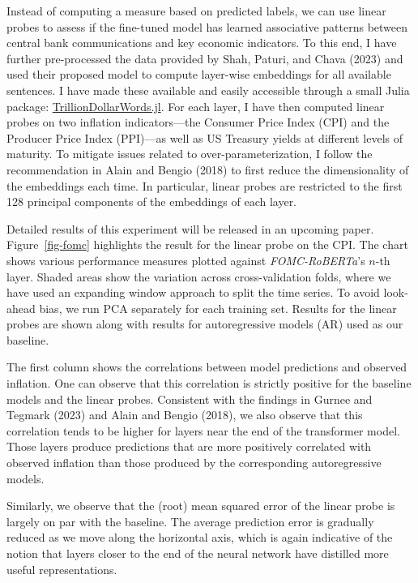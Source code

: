 \documentclass[
  letterpaper,
  DIV=11,
  numbers=noendperiod]{scrartcl}
\theoremstyle{plain}
\theoremstyle{remark}
\begin{document}
Instead of computing a measure based on predicted labels, we can use
linear probes to assess if the fine-tuned model has learned associative
patterns between central bank communications and key economic
indicators. To this end, I have further pre-processed the data provided
by Shah, Paturi, and Chava (2023) and used their proposed model to
compute layer-wise embeddings for all available sentences. I have made
these available and easily accessible through a small Julia package:
\href{https://github.com/pat-alt/TrillionDollarWords.jl}{TrillionDollarWords.jl}.
For each layer, I have then computed linear probes on two inflation
indicators---the Consumer Price Index (CPI) and the Producer Price Index
(PPI)---as well as US Treasury yields at different levels of maturity.
To mitigate issues related to over-parameterization, I follow the
recommendation in Alain and Bengio (2018) to first reduce the
dimensionality of the embeddings each time. In particular, linear probes
are restricted to the first 128 principal components of the embeddings
of each layer.

Detailed results of this experiment will be released in an upcoming
paper. Figure~\ref{fig-fomc} highlights the result for the linear probe
on the CPI. The chart shows various performance measures plotted against
\emph{FOMC-RoBERTa}'s \(n\)-th layer. Shaded areas show the variation
across cross-validation folds, where we have used an expanding window
approach to split the time series. To avoid look-ahead bias, we run PCA
separately for each training set. Results for the linear probes are
shown along with results for autoregressive models (AR) used as our
baseline.

The first column shows the correlations between model predictions and
observed inflation. One can observe that this correlation is strictly
positive for the baseline models and the linear probes. Consistent with
the findings in Gurnee and Tegmark (2023) and Alain and Bengio (2018),
we also observe that this correlation tends to be higher for layers near
the end of the transformer model. Those layers produce predictions that
are more positively correlated with observed inflation than those
produced by the corresponding autoregressive models.

Similarly, we observe that the (root) mean squared error of the linear
probe is largely on par with the baseline. The average prediction error
is gradually reduced as we move along the horizontal axis, which is
again indicative of the notion that layers closer to the end of the
neural network have distilled more useful representations.
\end{document}
